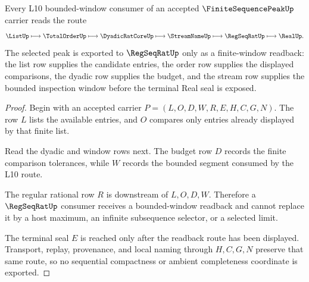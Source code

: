 \begin{theorem}
\label{thm:finite-sequence-peak-regseqrat-selector-handoff}
Every L10 bounded-window consumer of an accepted $\FiniteSequencePeakUp$ carrier reads the route
$$
\ListUp \longmapsto \TotalOrderUp \longmapsto \DyadicRatCoreUp \longmapsto \StreamNameUp \longmapsto \RegSeqRatUp \longmapsto \RealUp .
$$
The selected peak is exported to $\RegSeqRatUp$ only as a finite-window readback: the list row supplies the candidate entries, the order row supplies the displayed comparisons, the dyadic row supplies the budget, and the stream row supplies the bounded inspection window before the terminal Real seal is exposed.
\end{theorem}
\begin{proof}
Begin with an accepted carrier $P=(L,O,D,W,R,E,H,C,G,N)$. The row $L$ lists the available entries, and $O$ compares only entries already displayed by that finite list.

Read the dyadic and window rows next. The budget row $D$ records the finite comparison tolerances, while $W$ records the bounded segment consumed by the L10 route.

The regular rational row $R$ is downstream of $L,O,D,W$. Therefore a $\RegSeqRatUp$ consumer receives a bounded-window readback and cannot replace it by a host maximum, an infinite subsequence selector, or a selected limit.

The terminal seal $E$ is reached only after the readback route has been displayed. Transport, replay, provenance, and local naming through $H,C,G,N$ preserve that same route, so no sequential compactness or ambient completeness coordinate is exported.
\end{proof}


\begin{closurestatus}{\FiniteSequencePeakUp}
  \theoryclosure{\seedClosure}
  \formalstatus{\unformalizedV}
\end{closurestatus}
